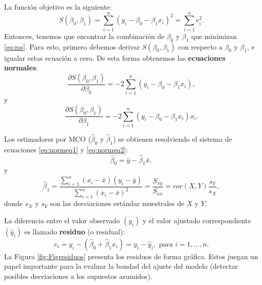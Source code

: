 \documentclass[
]{article}
\begin{document}
La función objetivo es la siguiente:
\begin{equation}
S(\beta_{0},\beta_{1}) = \sum_{i=1}^{n} \left( y_{i} - \beta_{0} - \beta_{1}x_{i} \right)^{2} = \sum_{i=1}^{n} e_{i}^{2}.
 \label{eq:rss}
\end{equation}
Entonces, tenemos que encontrar la combinación de \(\beta_{0}\) y \(\beta_{1}\) que minimizan \eqref{eq:rss}. Para esto, primero debemos derivar \(S(\beta_{0},\beta_{1})\) con respecto a \(\beta_{0}\) y \(\beta_{1}\), e igualar estas ecuación a cero. De esta forma obtenemos las \textbf{ecuaciones normales}:
\begin{equation}
\frac{\partial S(\beta_{0},\beta_{1})}{\partial \beta_{0}} = - 2\sum_{i=1}^{n}\left(y_{i}-\beta_{0}-\beta_{1}x_{i} \right),
\label{eq:normeq1}
\end{equation}
y
\begin{equation}
\frac{\partial S(\beta_{0},\beta_{1})}{\partial \beta_{1}} = - 2\sum_{i=1}^{n}\left(y_{i}-\beta_{0}-\beta_{1}x_{i} \right)x_{i}.
\label{eq:normeq2}
\end{equation}

Los estimadores por MCO (\(\widehat{\beta}_{0}\) y \(\widehat{\beta}_{1}\)) se obtienen resolviendo el sistema de ecuaciones \eqref{eq:normeq1} y \eqref{eq:normeq2}:
\[
\widehat{\beta}_{0} = \bar{y} - \widehat{\beta}_{1}\bar{x},
\]
y
\[
\widehat{\beta}_{1} = \frac{\sum_{i=1}^{n}(x_{i}-\bar{x})(y_{i}-\bar{y})}{\sum_{i=1}^{n}(x_{i}-\bar{x})^2} = \frac{S_{xy}}{S_{xx}} =  cor(X,Y)\frac{s_{Y}}{s_{X}},
\]
donde \(s_{X}\) y \(s_{Y}\) son las desviaciones estándar muestrales de \(X\) y \(Y\).

La diferencia entre el valor observado \((y_{i})\) y el valor ajustado correspondiente \((\widehat{y}_{i})\) es llamado \textbf{residuo} (o residual):
\[
e_{i}= y_{i} - (\widehat{\beta}_{0} + \widehat{\beta}_{1}x_{i}) = y_{i}-\widehat{y}_{i}, \mbox{ para }i=1,\ldots,n.
\]
La Figura \ref{fig:Figresiduos} presenta los residuos de forma gráfica. Estos juegan un papel importante para la evaluar la bondad del ajuste del modelo (detectar posibles desviaciones a los supuestos asumidos).
\end{document}

